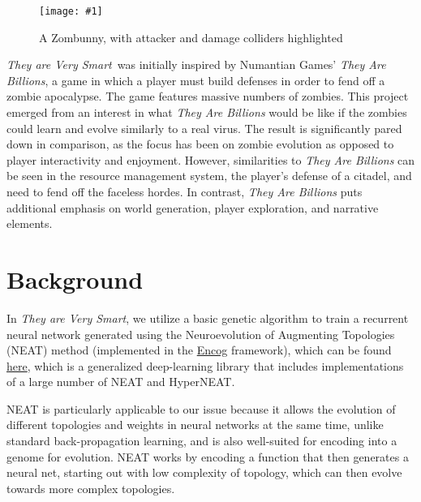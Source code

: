 \documentclass[letterpaper]{article}
\def\imfig#1#2{\begin{figure}[h] \centering \texttt{[image: \#1]} \caption{#2} \end{figure}}
\def\tavs{\textit{They are Very Smart}}
\begin{document}
\imfig{ZombunnyColliders}{A Zombunny, with attacker and damage colliders highlighted}


\tavs~was initially inspired by Numantian Games' \textit{They Are Billions}, a
game in which a player must build defenses in order to fend off a zombie
apocalypse. The game features massive numbers of zombies. This project emerged
from an interest in what \textit{They Are Billions} would be like if the zombies
could learn and evolve similarly to a real virus. The result is significantly pared down in
comparison, as the focus has been on zombie evolution as opposed to player
interactivity and enjoyment. However, similarities to \textit{They Are
  Billions} can be seen in the resource management system, the player's defense
of a citadel, and need to fend off the faceless hordes. In contrast,
\textit{They Are Billions} puts additional emphasis on world generation, player
exploration, and narrative elements.


\section{Background}
In \tavs, we utilize a basic genetic algorithm to train a recurrent neural
network generated using the Neuroevolution of Augmenting Topologies (NEAT)
method (implemented in the \href{https://www.heatonresearch.com/encog/}{Encog}
framework), which can be found \href{https://sharpneat.sourceforge.net/}{here},
which is a generalized deep-learning library that includes implementations of
a large number of NEAT and HyperNEAT.

NEAT is particularly applicable to our issue because it allows the evolution of different topologies and weights in neural networks at the same time, unlike standard back-propagation learning, and is also well-suited for encoding into a genome for evolution. NEAT works by encoding a function that then generates a neural net, starting out with low complexity of topology, which can then evolve towards more complex topologies.
\end{document}
